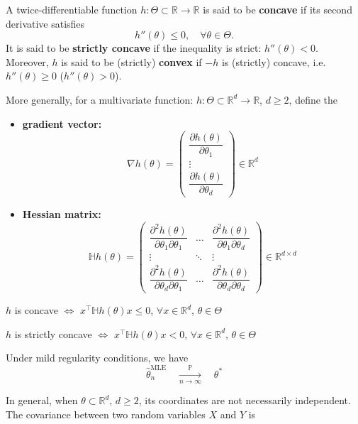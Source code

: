 \documentclass[a4paper, 10pt,landscape]{article}
\begin{document}
\begin{multicols*}{3}
\begin{description}
	\item A twice-differentiable function $h:\Theta\subset\mathbb{R}\rightarrow\mathbb{R}$ is said to be {\bf concave} if its second derivative satisfies
	$$h''(\theta)\leq0,\quad\forall\theta\in\Theta.$$
	It is said to be {\bf strictly concave} if the inequality is strict: $h''(\theta)<0$. Moreover, $h$ is said to be (strictly) {\bf convex} if $-h$ is (strictly) concave, i.e. $h''(\theta)\geq0$ ($h''(\theta)>0$).
	\item[Multivariate Concave Functions] More generally, for a multivariate function: $h:\Theta\subset\mathbb{R}^d\rightarrow\mathbb{R}$, $d\geq2$, define the
	\begin{itemize}
		\item {\bf gradient vector:}
		$$\nabla h(\theta)=\begin{pmatrix}
		\dfrac{\partial h(\theta)}{\partial\theta_1}\\
		\vdots\\
		\dfrac{\partial h(\theta)}{\partial\theta_d}
		\end{pmatrix}\in\mathbb{R}^d$$
		\item {\bf Hessian matrix:}
		$$\mathbb{H}h(\theta)=
		\begin{pmatrix}
			\dfrac{\partial^2h(\theta)}{\partial\theta_1\partial\theta_1} & \dots & \dfrac{\partial^2h(\theta)}{\partial\theta_1\partial\theta_d}\\
			\vdots& \ddots &\vdots\\
			\dfrac{\partial^2h(\theta)}{\partial\theta_d\partial\theta_1}& \dots & \dfrac{\partial^2h(\theta)}{\partial\theta_d\partial\theta_d}
		\end{pmatrix} \in\mathbb{R}^{d\times d}
		$$
	\end{itemize}
	\item $h$ is concave $\iff$ $x^\intercal\mathbb{H}h(\theta)x\leq0$, $\forall x\in\mathbb{R}^d$, $\theta\in\Theta$
	\item $h$ is strictly concave $\iff$ $x^\intercal\mathbb{H}h(\theta)x<0$, $\forall x\in\mathbb{R}^d$, $\theta\in\Theta$
	\item[Consistency of Maximum Likelihood Estimator] Under mild regularity conditions, we have
	$$\hat{\theta}_n^\text{MLE}\quad\xrightarrow[n\rightarrow\infty]{\mathbb{P}}\quad\theta^*$$
	\item[Covariance] In general, when $\theta\subset\mathbb{R}^d$, $d\geq2$, its coordinates are not necessarily independent. The covariance between two random variables $X$ and $Y$ is \begin{align*}

\end{align*}
\end{description}
\end{multicols*}
\end{document}
